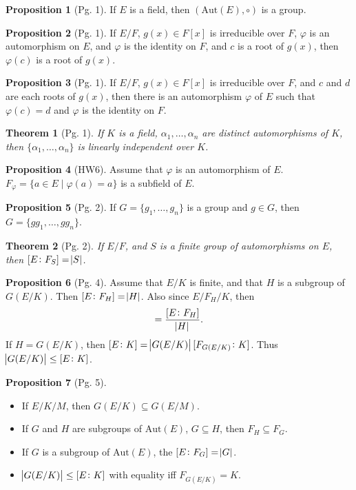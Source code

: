 \documentclass{article}
\newtheorem{theorem}{Theorem}
\theoremstyle{definition}
\newtheorem{prop}{Proposition}
\theoremstyle{remark}
\theoremstyle{definition}
\begin{document}
    \begin{prop}[Pg. 1]
        If $E$ is a field, then $(\text{Aut}(E),\circ)$ is a group.
    \end{prop}
    \begin{prop}[Pg. 1]
        If $E/F$, $g(x)\in F[x]$ is irreducible over $F$, $\varphi$ is an automorphism on $E$, and $\varphi$ is the identity on $F$, and $c$ is a root of $g(x)$, then $\varphi(c)$ is a root of $g(x)$.
    \end{prop}
    \begin{prop}[Pg. 1]
        If $E/F$, $g(x)\in F[x]$ is irreducible over $F$, and $c$ and $d$ are each roots of $g(x)$, then there is an automorphism $\varphi$ of $E$ such that $\varphi(c)=d$ and $\varphi$ is the identity on $F$.
    \end{prop}
    \begin{theorem}[Pg. 1]
        If $K$ is a field, $\alpha_1,\dots,\alpha_n$ are distinct automorphisms of $K$, then $\{\alpha_1,\dots,\alpha_n\}$ is linearly independent over $K$.
    \end{theorem}
    \begin{prop}[HW6]
        Assume that $\varphi$ is an automorphism of $E$. $F_{\varphi}=\{a\in E\mid \varphi(a)=a\}$ is a subfield of $E$. 
    \end{prop}
    \begin{prop}[Pg. 2]
        If $G=\{g_1,\dots,g_n\}$ is a group and $g\in G$, then $G=\{gg_1,\dots,gg_n\}$.
    \end{prop}
    \begin{theorem}[Pg. 2]
        If $E/F$, and $S$ is a finite group of automorphisms on $E$, then $[E\colon F_S]=\abs{S}$.
    \end{theorem}
    \begin{prop}[Pg. 4]
        Assume that $E/K$ is finite, and that $H$ is a subgroup of $G(E/K)$. Then $[E\colon F_H]=\abs{H}$. Also since $E/F_H/K$, then 
            \begin{equation*}
                [F_H\colon K]=\frac{[E\colon F_H]}{\abs{H}}.
            \end{equation*}
        If $H=G(E/K)$, then $[E\colon K]=\abs{G(E/K)}[F_{G(E/K)}\colon K]$. Thus $\abs{G(E/K)}\leq[E\colon K]$.
    \end{prop}
    \begin{prop}[Pg. 5]\hfill\par
        \begin{itemize}
            \item If $E/K/M$, then $G(E/K)\subseteq G(E/M)$.
            \item If $G$ and $H$ are subgroups of $\text{Aut}(E)$, $G\subseteq H$, then $F_H\subseteq F_G$.
            \item If $G$ is a subgroup of $\text{Aut}(E)$, the $[E\colon F_G]=\abs{G}$.
            \item $\abs{G(E/K)}\leq[E\colon K]$ with equality iff $F_{G(E/K)}=K$.
        \end{itemize}
    \end{prop}\newpage
    
\end{document}

